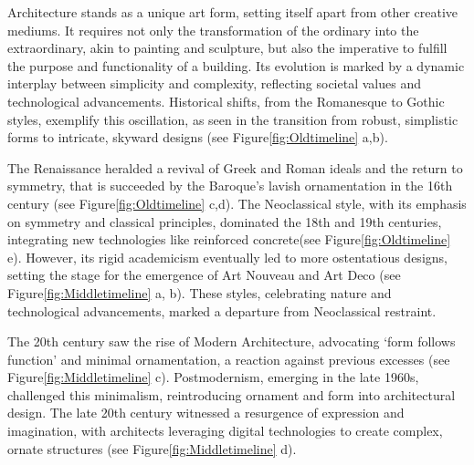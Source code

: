 


Architecture stands as a unique art form, setting itself apart from other creative mediums.
It requires not only the transformation of the ordinary into the extraordinary, akin to painting and sculpture, but also the imperative to fulfill the purpose and functionality of a building\cite{Hnin2022}.
Its evolution is marked by a dynamic interplay between simplicity and complexity, reflecting societal values and technological advancements\cite{Economakis2023}.
Historical shifts, from the Romanesque to Gothic styles, exemplify this oscillation, as seen in the transition from robust, simplistic forms to intricate, skyward designs\cite{Arora2023, Stacbond2020} (see Figure\ref{fig:Oldtimeline} a,b).

The Renaissance heralded a revival of Greek and Roman ideals and the return to symmetry, that is succeeded by the Baroque's lavish ornamentation in the 16th century\cite{Economakis2023} (see Figure\ref{fig:Oldtimeline} c,d).
The Neoclassical style, with its emphasis on symmetry and classical principles, dominated the 18th and 19th centuries, integrating new technologies like reinforced concrete\cite{Economakis2023}(see Figure\ref{fig:Oldtimeline} e).
However, its rigid academicism eventually led to more ostentatious designs, setting the stage for the emergence of Art Nouveau and Art Deco (see Figure\ref{fig:Middletimeline} a, b).
These styles, celebrating nature and technological advancements, marked a departure from Neoclassical restraint\cite{Salas2018, Arora2023}.

The 20th century saw the rise of Modern Architecture, advocating `form follows function' and minimal ornamentation, a reaction against previous excesses\cite{Gage2015, Venturi1972} (see Figure\ref{fig:Middletimeline} c).
Postmodernism, emerging in the late 1960s, challenged this minimalism, reintroducing ornament and form into architectural design.
The late 20th century witnessed a resurgence of expression and imagination, with architects leveraging digital technologies to create complex, ornate structures\cite{Burlando2019} (see Figure\ref{fig:Middletimeline} d).

